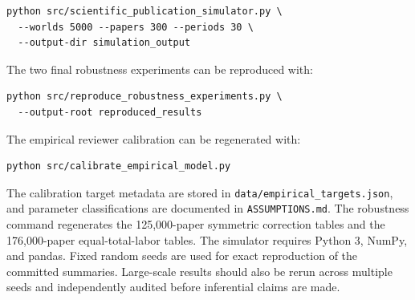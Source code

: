 \documentclass[11pt]{article}
\begin{document}
\begin{verbatim}
python src/scientific_publication_simulator.py \
  --worlds 5000 --papers 300 --periods 30 \
  --output-dir simulation_output
\end{verbatim}

The two final robustness experiments can be reproduced with:

\begin{verbatim}
python src/reproduce_robustness_experiments.py \
  --output-root reproduced_results
\end{verbatim}

The empirical reviewer calibration can be regenerated with:

\begin{verbatim}
python src/calibrate_empirical_model.py
\end{verbatim}

The calibration target metadata are stored in \texttt{data/empirical\_targets.json}, and parameter classifications are documented in \texttt{ASSUMPTIONS.md}. The robustness command regenerates the 125,000-paper symmetric correction tables and the 176,000-paper equal-total-labor tables. The simulator requires Python 3, NumPy, and pandas. Fixed random seeds are used for exact reproduction of the committed summaries. Large-scale results should also be rerun across multiple seeds and independently audited before inferential claims are made.
\end{document}
